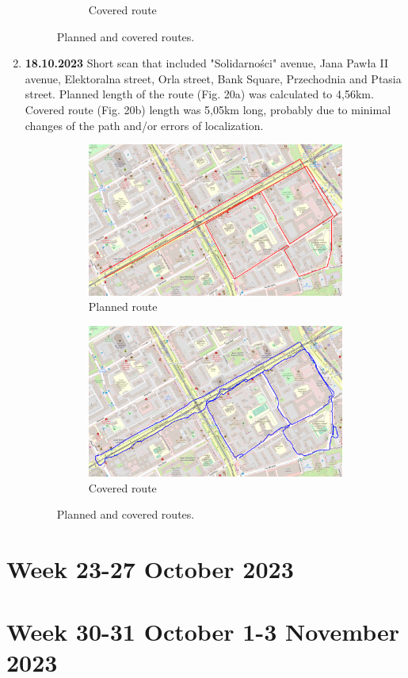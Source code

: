\documentclass[a4paper,12pt]{article}
\begin{document}
\begin{enumerate}
\begin{figure}[H]
\begin{subfigure}{.95\textwidth}
			\caption{Covered route}
			\label{fig:b18}
		\end{subfigure}
		\caption{Planned and covered routes.}
		\label{fig:fig18}
	\end{figure}
	\item \textbf{18.10.2023} Short scan that included "Solidarności" avenue, Jana Pawła II avenue, Elektoralna street, Orla street, Bank Square, Przechodnia and Ptasia street. Planned length of the route (Fig. 20a) was calculated to 4,56km. Covered route (Fig. 20b) length was 5,05km long, probably due to minimal changes of the path and/or errors of localization.
	\begin{figure}[H]
		\centering
		\begin{subfigure}{.95\textwidth}
			\centering
			\includegraphics[width=1\linewidth]{route_p19}
			\caption{Planned route}
			\label{fig:a19}
		\end{subfigure}%
		\linebreak
		\begin{subfigure}{.95\textwidth}
			\centering
			\includegraphics[width=1\linewidth]{route_c19}
			\caption{Covered route}
			\label{fig:b19}
		\end{subfigure}
		\caption{Planned and covered routes.}
		\label{fig:fig19}
	\end{figure} 
\end{enumerate}
\section{Week 23-27 October 2023}

\section{Week 30-31 October 1-3 November 2023}
\end{document}

